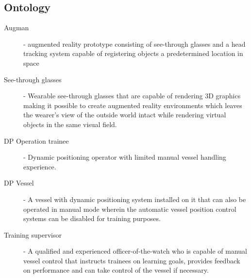 \subsection{Ontology}
\begin{description}
\item[Augman] - augmented reality prototype consisting of see-through glasses and a head tracking system capable of registering objects a predetermined location in space
\item[See-through glasses] - Wearable see-through glasses that are capable of rendering 3D graphics making it possible to create augmented reality environments which leaves the wearer’s view of the outside world intact while rendering virtual objects in the same visual field.
\item[DP Operation trainee] - Dynamic positioning operator with limited manual vessel handling experience.
\item[DP Vessel] - A vessel with dynamic positioning system installed on it that can also be operated in manual mode wherein the automatic vessel position control systems can be disabled for training purposes.
\item[Training supervisor] - A qualified and experienced officer-of-the-watch who is capable of manual vessel control that instructs trainees on learning goals, provides feedback on performance and can take control of the vessel if necessary.

\end{description}